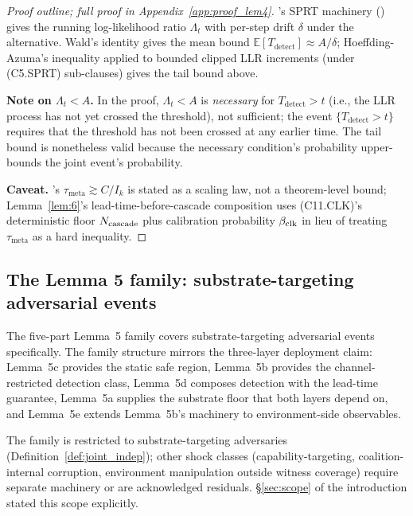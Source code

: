 \begin{proof}[Proof outline; full proof in Appendix~\ref{app:proof_lem4}]
\citep[Exogenous~Verification]{lasser2026exo}'s SPRT machinery
(\citep[Definition of Behavioral Consistency Monitor]{lasser2026exo})
gives the running log-likelihood ratio $\Lambda_t$ with per-step
drift $\delta$ under the alternative.  Wald's identity gives the
mean bound $\mathbb{E}[T_{\mathrm{detect}}] \approx A/\delta$;
Hoeffding-Azuma's inequality applied to bounded clipped
LLR increments (under (C5.SPRT) sub-clauses) gives the tail bound
above.

\textbf{Note on $\Lambda_t < A$.}  In the proof, $\Lambda_t < A$ is
\emph{necessary} for $T_{\mathrm{detect}} > t$ (i.e., the LLR
process has not yet crossed the threshold), not sufficient; the
event $\{T_{\mathrm{detect}} > t\}$ requires that the threshold has
not been crossed at any earlier time.  The tail bound is
nonetheless valid because the necessary condition's probability
upper-bounds the joint event's probability.

\textbf{Caveat.} \citep[Phase~Redundancy]{lasser2026phase}'s
    $\tau_{\mathrm{meta}} \gtrsim C/I_k$ is stated as a scaling law, not a
    theorem-level bound; Lemma~\ref{lem:6}'s lead-time-before-cascade
    composition uses (C11.CLK)'s deterministic floor $N_{\mathrm{cascade}}$ plus calibration
    probability $\beta_{\mathrm{clk}}$ in lieu of treating $\tau_{\mathrm{meta}}$ as a hard
    inequality.
\end{proof}

\subsection{The Lemma 5 family: substrate-targeting adversarial events}
\label{sec:lem5_family}

The five-part Lemma~5 family covers substrate-targeting adversarial
events specifically. The family structure mirrors the three-layer
deployment claim: Lemma~5c provides the static safe region,
Lemma~5b provides the channel-restricted detection class,
Lemma~5d composes detection with the lead-time guarantee,
Lemma~5a supplies the substrate floor that both layers depend on,
and Lemma~5e extends Lemma~5b's machinery to environment-side
observables.

The family is restricted to substrate-targeting adversaries
(Definition~\ref{def:joint_indep}); other shock classes
(capability-targeting, coalition-internal corruption, environment
manipulation outside witness coverage) require separate machinery
or are acknowledged residuals. \S\ref{sec:scope} of the
introduction stated this scope explicitly.

